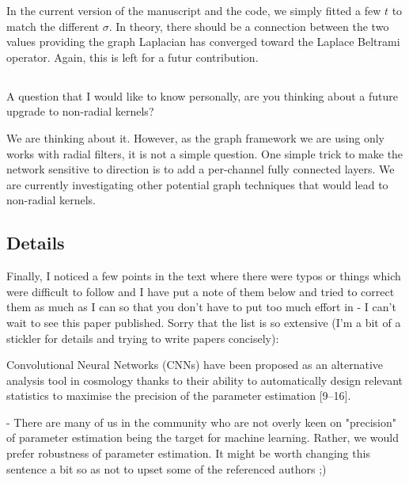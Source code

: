 \documentclass[12pt,a4paper]{article}
\newcommand{\todo}[1]{{\color[rgb]{.6,.1,.6}{TODO: #1}}}
\newcommand{\1}{\b{1}}              %
\newcommand{\0}{\b{0}}              %
\begin{document}
In the current version of the manuscript and the code, we simply fitted a few $t$ to match the different $\sigma$. In theory, there should be a connection between the two values providing the graph Laplacian has converged toward the Laplace Beltrami operator. Again, this is left for a futur contribution.

\subsection{}
\begin{mdframed}[style=comment] 
A question that I would like to know personally, are you thinking about a future upgrade to non-radial kernels?
\end{mdframed}
We are thinking about it. However, as the graph framework we are using only works with radial filters, it is not a simple question. One simple trick to make the network sensitive to direction is to add a per-channel fully connected layers. We are currently investigating other potential graph techniques that would lead to non-radial kernels.


\subsection{Details}
\begin{mdframed}[style=comment] 
Finally, I noticed a few points in the text where there were typos or things which were difficult to follow and I have put a note of them below and tried to correct them as much as I can so that you don't have to put too much effort in - I can't wait to see this paper published. Sorry that the list is so extensive (I'm a bit of a stickler for details and trying to write papers concisely):
\end{mdframed}
\todo{Assigned @tomek. 
This reviewer really spend the time. Should we say something here?}

\begin{mdframed}[style=comment] 
Convolutional Neural Networks (CNNs) have been proposed as an alternative analysis tool in cosmology thanks to their ability to automatically design relevant statistics to maximise the precision of the parameter estimation [9–16].

- There are many of us in the community who are not overly keen on "precision" of parameter estimation being the target for machine learning. Rather, we would prefer robustness of parameter estimation. It might be worth changing this sentence a bit so as not to upset some of the referenced authors ;)
\end{mdframed}
\todo{Assigned: @tomek, @michael}
\end{document}
